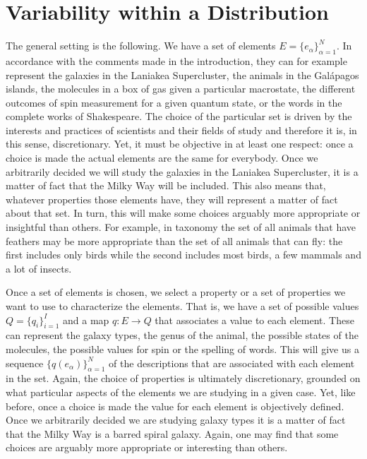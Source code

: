 \documentclass[iopart]{revtex4-1}
\begin{document}
\section{Variability within a Distribution\label{vwd}}

The general setting is the following. We have a set of elements $E = \{e_\alpha\}_{\alpha=1}^N$. In accordance with the comments made in the introduction, they can for example represent the galaxies in the Laniakea Supercluster, the animals in the Gal\'{a}pagos islands, the molecules in a box of gas given a particular macrostate, the different outcomes of spin measurement for a given quantum state, or the words in the complete works of Shakespeare. The choice of the particular set is driven by the interests and practices of scientists and their fields of study and therefore it is, in this sense, discretionary. Yet, it must be objective in at least one respect: once a choice is made the actual elements are the same for everybody. Once we arbitrarily decided we will study the galaxies in the Laniakea Supercluster, it is a matter of fact that the Milky Way will be included. This also means that, whatever properties those elements have, they will represent a matter of fact about that set. In turn, this will make some choices arguably more appropriate or insightful than others. For example, in taxonomy the set of all animals that have feathers may be more appropriate than the set of all animals that can fly: the first includes only birds while the second includes most birds, a few mammals and a lot of insects.

Once a set of elements is chosen, we select a property or a set of properties we want to use to characterize the elements. That is, we have a set of possible values $Q=\{q_i\}_{i=1}^I$ and a map $q : E \to Q$ that associates a value to each element. These can represent the galaxy types, the genus of the animal, the possible states of the molecules, the possible values for spin or the spelling of words. This will give us a sequence $\{q(e_\alpha)\}_{\alpha=1}^N$ of the descriptions that are associated with each element in the set. Again, the choice of properties is ultimately discretionary, grounded on what particular aspects of the elements we are studying in a given case. Yet, like before, once a choice is made the value for each element is objectively defined. Once we arbitrarily decided we are studying galaxy types it is a matter of fact that the Milky Way is a barred spiral galaxy. Again, one may find that some choices are arguably more appropriate or interesting than others.
\end{document}
